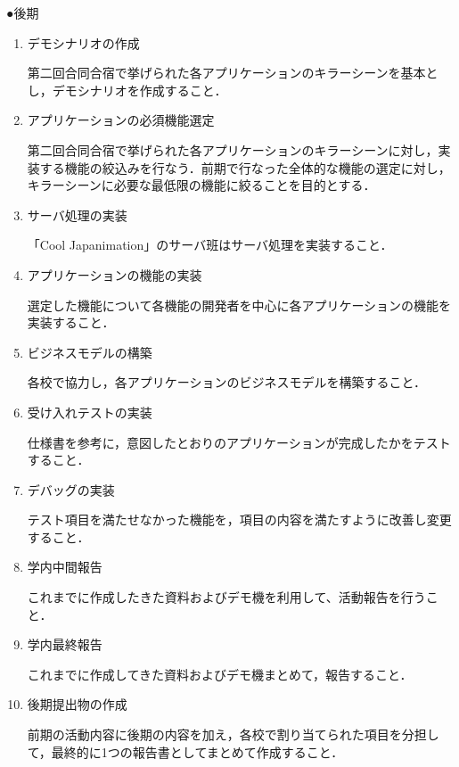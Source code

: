 \par ●後期
\begin{enumerate}
\item デモシナリオの作成
\par 第二回合同合宿で挙げられた各アプリケーションのキラーシーンを基本とし，デモシナリオを作成すること．
\item アプリケーションの必須機能選定
\par 第二回合同合宿で挙げられた各アプリケーションのキラーシーンに対し，実装する機能の絞込みを行なう．前期で行なった全体的な機能の選定に対し，キラーシーンに必要な最低限の機能に絞ることを目的とする．
\item サーバ処理の実装
\par 「Cool Japanimation」のサーバ班はサーバ処理を実装すること．
\item アプリケーションの機能の実装
\par 選定した機能について各機能の開発者を中心に各アプリケーションの機能を実装すること．
\item ビジネスモデルの構築
\par 各校で協力し，各アプリケーションのビジネスモデルを構築すること．
\item 受け入れテストの実装
\par 仕様書を参考に，意図したとおりのアプリケーションが完成したかをテストすること．
\item デバッグの実装
\par テスト項目を満たせなかった機能を，項目の内容を満たすように改善し変更すること．
\item 学内中間報告
\par これまでに作成したきた資料およびデモ機を利用して、活動報告を行うこと．
\item 学内最終報告
\par これまでに作成してきた資料およびデモ機まとめて，報告すること． 
\item 後期提出物の作成
\par 前期の活動内容に後期の内容を加え，各校で割り当てられた項目を分担して，最終的に1つの報告書としてまとめて作成すること．
\end{enumerate}

